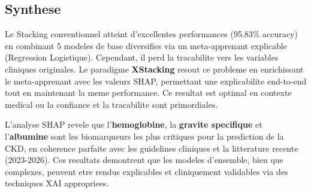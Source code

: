 \subsection{Synthese}

Le Stacking conventionnel atteint d'excellentes performances (95.83\% accuracy) en combinant 5 modeles de base diversifies via un meta-apprenant explicable (Regression Logistique). Cependant, il perd la tracabilite vers les variables cliniques originales. Le paradigme \textbf{XStacking} resout ce probleme en enrichissant le meta-apprenant avec les valeurs SHAP, permettant une explicabilite end-to-end tout en maintenant la meme performance. Ce resultat est optimal en contexte medical ou la confiance et la tracabilite sont primordiales.

L'analyse SHAP revele que l'\textbf{hemoglobine}, la \textbf{gravite specifique} et l'\textbf{albumine} sont les biomarqueurs les plus critiques pour la prediction de la CKD, en coherence parfaite avec les guidelines cliniques et la litterature recente (2023-2026). Ces resultats demontrent que les modeles d'ensemble, bien que complexes, peuvent etre rendus explicables et cliniquement validables via des techniques XAI appropriees.
